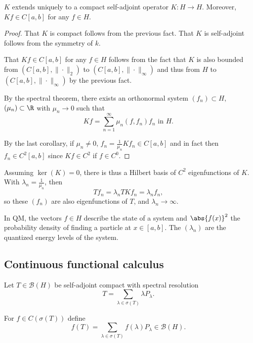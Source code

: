 \documentclass{article}
\begin{document}
\begin{cor}
    $K$ extends uniquely to a compact self-adjoint operator $K: H \to H$.
    Moreover, $Kf \in C[a,b]$ for any $f \in H$.
\end{cor}

\begin{proof}
    That $K$ is compact follows from the previous fact.
    That $K$ is self-adjoint follows from the symmetry of $k$.

    That $Kf \in C[a,b]$ for any $f \in H$ follows from the fact that $K$ is also bounded from $(C[a,b], \|\cdot\|_2)$ to $(C[a,b],\|\cdot\|_\infty)$ and thus from $H$ to $(C[a,b], \|\cdot\|_\infty)$ by the previous fact.

    By the spectral theorem, there exists an orthonormal system $(f_n) \subset H$, $(\mu_n) \subset \R$ with $\mu_n \to 0$ such that
    \begin{equation*}
        Kf = \sum_{n=1}^\infty \mu_n (f, f_n) f_n \text{  in } H.
    \end{equation*}

    By the last corollary, if $\mu_n \neq 0$, $f_n = \frac{1}{\mu_n} K f_n \in C[a,b]$ and in fact then $f_n \in C^2 [a,b]$ since $Kf \in C^2$ if $f \in C^0$.
\end{proof}

Assuming $\ker(K) = 0$, there is thus a Hilbert basis of $C^2$ eigenfunctions of $K$.
With $\lambda_n = \frac{1}{\mu_n}$, then
\begin{equation*}
    T f_n = \lambda_n T K f_n = \lambda_n f_n,
\end{equation*}
so these $(f_n)$ are also eigenfunctions of $T$, and $\lambda_n \to \infty$.

In QM, the vectors $f \in H$ describe the state of a system and $\abs{f(x)}^2$ the probability density of finding a particle at $x \in [a,b]$. The $(\lambda_n)$ are the quantized energy levels of the system.


\subsection{Continuous functional calculus}
Let $T \in \mathcal{B}(H)$ be self-adjoint compact with spectral resolution
\begin{equation*}
    T = \sum_{\lambda \in \sigma(T)} \lambda P_\lambda.
\end{equation*}

For $f \in C(\sigma(T))$ define
\begin{equation*}
    f(T) = \sum_{\lambda \in \sigma(T)} f(\lambda) P_\lambda \in \mathcal{B}(H).
\end{equation*}
\end{document}
